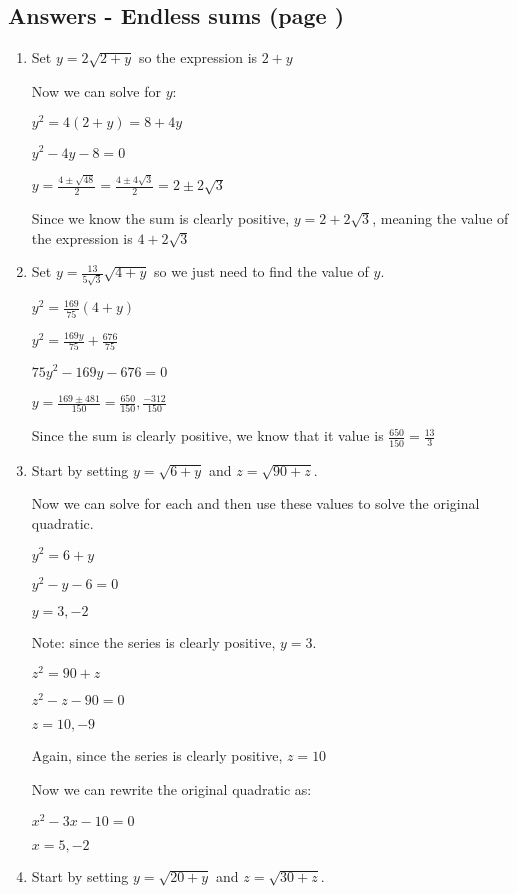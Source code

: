 \documentclass[../main.tex]{subfiles}
\begin{document}
\subsection*{Answers - Endless sums (page \pageref{Endless sums})}
\label{Endless sums answers}
\begin{enumerate}[itemsep=1cm]
    \item 
    Set $y=2\sqrt{2+y}$ so the expression is $2+y$

    Now we can solve for $y$:

    $y^2=4(2+y)=8+4y$

    $y^2-4y-8=0$

    $y=\frac{4 \pm \sqrt{48}}{2}=\frac{4\pm 4\sqrt{3}}{2}=2\pm 2\sqrt{3}$

    Since we know the sum is clearly positive, $y=2+2\sqrt{3}$, meaning the value of the expression is $4+2\sqrt{3}$

    \item 
    Set $y=\frac{13}{5\sqrt{3}}\sqrt{4+y}$ so we just need to find the value of $y$.

    $y^2=\frac{169}{75}(4+y)$

    $y^2=\frac{169y}{75}+\frac{676}{75}$

    $75y^2-169y-676=0$

    $y=\frac{169\pm 481}{150}=\frac{650}{150}, \frac{-312}{150}$

    Since the sum is clearly positive, we know that it value is $\frac{650}{150}=\frac{13}{3}$
    
    \item
    Start by setting $y=\sqrt{6+y}$ and $z=\sqrt{90+z}$.

    Now we can solve for each and then use these values to solve the original quadratic.

    $y^2=6+y$

    $y^2-y-6=0$

    $y=3, -2$

    Note: since the series is clearly positive, $y=3$.

    $z^2=90+z$

    $z^2-z-90=0$

    $z=10, -9$

    Again, since the series is clearly positive, $z=10$

    Now we can rewrite the original quadratic as:

    $x^2-3x-10=0$

    $x=5, -2$


    \item 
    Start by setting $y=\sqrt{20+y}$ and $z=\sqrt{30+z}$.


\end{enumerate}
\end{document}
